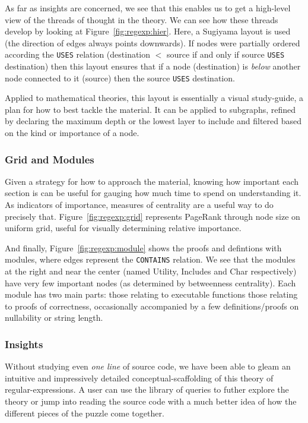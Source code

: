 As far as insights are concerned, we see that this enables us to get a
high-level view of the threads of thought in the theory. We can see how these
threads develop by looking at Figure~\ref{fig:regexp:hier}.  Here, a Sugiyama
layout is used (the direction of edges always points downwards). If nodes were
partially ordered according the \texttt{USES} relation (destination $<$ source
if and only if source \texttt{USES} destination) then this layout ensures that
if a node (destination) is \emph{below} another node connected to it (source)
then the source \texttt{USES} destination.

Applied to mathematical theories, this layout is essentially a visual
study-guide, a plan for how to best tackle the material. It can be applied to
subgraphs, refined by declaring the maximum depth or the lowest layer to include
and filtered based on the kind or importance of a node.

\subsubsection{Grid and Modules}

Given a strategy for how to approach the material, knowing how important each
section is can be useful for gauging how much time to spend on understanding it.
As indicators of importance, measures of centrality are a useful way to do
precisely that. Figure~\ref{fig:regexp:grid} represents PageRank through node
size on uniform grid, useful for visually determining relative importance.

And finally, Figure~\ref{fig:regexp:module} shows the proofs and defintions with
modules, where edges represent the \texttt{CONTAINS} relation. We see that the
modules at the right and near the center (named Utility, Includes and Char
respectively) have very few important nodes (as determined by betweenness
centrality). Each module has two main parts: those relating to
\textcolor{graphblue}{executable functions} those relating to
\textcolor{graphorange}{proofs of correctness}, occasionally accompanied by a
few definitions/proofs on \textcolor{graphviolet}{nullability} or
\textcolor{graphpurple}{string length}.

\subsubsection{Insights}

Without studying even \emph{one line} of source code, we have been able to gleam
an intuitive and impressively detailed conceptual-scaffolding of this theory of
regular-expressions. A user can use the library of queries to futher explore the
theory or jump into reading the source code with a much better idea of how
the different pieces of the puzzle come together.

